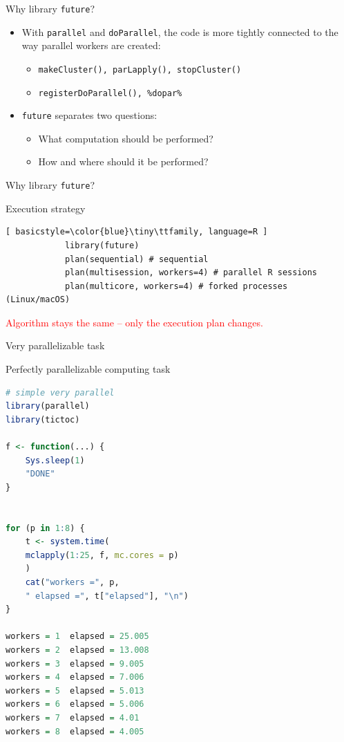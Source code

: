 \documentclass[compress,xcolor=table]{beamer}
\newcommand{\CoG}{\textcolor{red}}
\begin{document}
\begin{frame}{Why library \texttt{future}?} 
	\small 
	\begin{itemize}
		\item With \texttt{parallel} and \texttt{doParallel}, the code is more tightly connected to the way parallel workers are created: 
		\begin{itemize} 
			\item \texttt{makeCluster(), parLapply(), stopCluster()} 
			\item \texttt{registerDoParallel(), \%dopar\%} 
		\end{itemize} 
		\item \texttt{future} separates two questions: 
		\begin{itemize} 
				\item {What} computation should be performed? 
				\item {How and where} should it be performed? 
		\end{itemize} 
	\end{itemize} 
\end{frame}



\begin{frame}[fragile]{Why library {\tt future}?} 
	\begin{block}{Execution strategy}\scriptsize 
		\begin{lstlisting}[ basicstyle=\color{blue}\tiny\ttfamily, language=R ] 
			library(future) 
			plan(sequential) # sequential 
			plan(multisession, workers=4) # parallel R sessions 
			plan(multicore, workers=4) # forked processes (Linux/macOS) 
		\end{lstlisting} 
	\end{block} 
	\begin{center} \CoG{Algorithm stays the same -- only the execution plan changes.} 
	\end{center} 
\end{frame}


\begin{frame}[fragile]{Very parallelizable task}
\begin{block}{Perfectly parallelizable computing task}\tiny
	\begin{lstlisting}[basicstyle=\color{blue}\tiny\ttfamily,language=R,escapeinside=`']
# simple very parallel
library(parallel)
library(tictoc)

f <- function(...) {
	Sys.sleep(1) 
	"DONE"
}


for (p in 1:8) {
	t <- system.time(
	mclapply(1:25, f, mc.cores = p)
	)	
	cat("workers =", p,
	" elapsed =", t["elapsed"], "\n")
}

workers = 1  elapsed = 25.005 
workers = 2  elapsed = 13.008 
workers = 3  elapsed = 9.005 
workers = 4  elapsed = 7.006 
workers = 5  elapsed = 5.013 
workers = 6  elapsed = 5.006 
workers = 7  elapsed = 4.01 
workers = 8  elapsed = 4.005 

	\end{lstlisting}
\end{block}
\end{frame}
\end{document}
